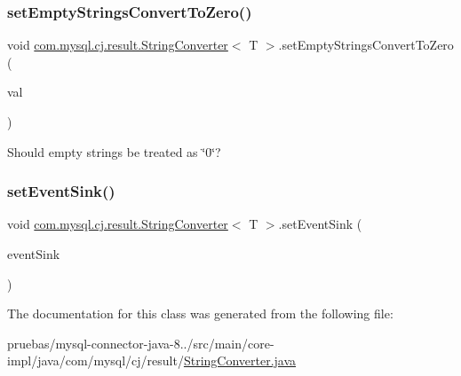 \mbox{\label{classcom_1_1mysql_1_1cj_1_1result_1_1_string_converter_ab43f945452ba741f823d67b68b3bade8}} 
\subsubsection{\texorpdfstring{set\+Empty\+Strings\+Convert\+To\+Zero()}{setEmptyStringsConvertToZero()}}
{\footnotesize\ttfamily void \mbox{\hyperlink{classcom_1_1mysql_1_1cj_1_1result_1_1_string_converter}{com.\+mysql.\+cj.\+result.\+String\+Converter}}$<$ T $>$.set\+Empty\+Strings\+Convert\+To\+Zero (\begin{DoxyParamCaption}\item[{boolean}]{val }\end{DoxyParamCaption})}

Should empty strings be treated as \char`\"{}0\char`\"{}? \mbox{\label{classcom_1_1mysql_1_1cj_1_1result_1_1_string_converter_a5760eb57f0d3b27722734bd63e741507}} 
\subsubsection{\texorpdfstring{set\+Event\+Sink()}{setEventSink()}}
{\footnotesize\ttfamily void \mbox{\hyperlink{classcom_1_1mysql_1_1cj_1_1result_1_1_string_converter}{com.\+mysql.\+cj.\+result.\+String\+Converter}}$<$ T $>$.set\+Event\+Sink (\begin{DoxyParamCaption}\item[{\mbox{\hyperlink{interfacecom_1_1mysql_1_1cj_1_1log_1_1_profiler_event_handler}{Profiler\+Event\+Handler}}}]{event\+Sink }\end{DoxyParamCaption})}



The documentation for this class was generated from the following file\+:\begin{DoxyCompactItemize}
\item 
pruebas/mysql-\/connector-\/java-\/8../src/main/core-\/impl/java/com/mysql/cj/result/\mbox{\hyperlink{_string_converter_8java}{String\+Converter.\+java}}\end{DoxyCompactItemize}
